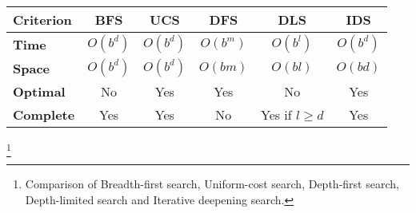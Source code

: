 \begin{center}
    \begin{tabular}{|l|c|c|c|c|c|}
        \hline
        \bf Criterion & BFS & UCS & DFS & DLS & IDS \\
        \hline
        \bf Time & $O(b^d)$ & $O(b^d)$ & $O(b^m)$ & $O(b^l)$ & $O(b^d)$ \\
        \hline
        \bf Space & $O(b^d)$ & $O(b^d)$ & $O(bm)$ & $O(bl)$ & $O(bd)$ \\
        \hline
        \bf Optimal & No & Yes & Yes & No & Yes \\
        \hline
        \bf Complete & Yes & Yes & No & Yes if $l \ge d$ & Yes \\
        \hline
    \end{tabular}
\end{center}
\footnote{Comparison of Breadth-first search, Uniform-cost search, Depth-first search, Depth-limited search and Iterative deepening search.}